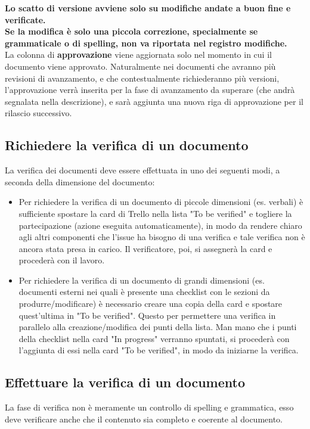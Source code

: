 \noindent
\textbf{Lo scatto di versione avviene solo su modifiche andate a buon fine e verificate.}
\\

\noindent
\textbf{Se la modifica è solo una piccola correzione, specialmente se grammaticale o di
spelling, non va riportata nel registro modifiche.}\\


\noindent
La colonna di \textbf{approvazione} viene aggiornata solo nel momento in cui il documento viene approvato. Naturalmente nei documenti che avranno più revisioni di avanzamento, e che contestualmente richiederanno più versioni, l'approvazione verrà inserita per la fase di avanzamento da superare (che andrà segnalata nella descrizione), e sarà aggiunta una nuova riga di approvazione per il rilascio successivo.

\subsection{Richiedere la verifica di un documento}
La verifica dei documenti deve essere effettuata in uno dei seguenti modi, a seconda della dimensione del documento:
\begin{itemize}
    \item Per richiedere la verifica di un documento di piccole dimensioni (es. verbali) è sufficiente spostare la card di Trello nella lista "To be verified" e togliere la partecipazione (azione eseguita automaticamente), in modo da rendere chiaro agli altri componenti che l'issue ha bisogno di una verifica e tale verifica non è ancora stata presa in carico. Il verificatore, poi, si assegnerà la card e procederà con il lavoro.
    \item Per richiedere la verifica di un documento di grandi dimensioni (es. documenti esterni nei quali è presente una checklist con le sezioni da produrre/modificare) è necessario creare una copia della card e spostare quest'ultima in "To be verified". Questo per permettere una verifica in parallelo alla creazione/modifica dei punti della lista. Man mano che i punti della checklist nella card "In progress" verranno spuntati, si procederà con l'aggiunta di essi nella card "To be verified", in modo da iniziarne la verifica.
\end{itemize}

\subsection{Effettuare la verifica di un documento}
La fase di verifica non è meramente un controllo di spelling e grammatica, esso
deve verificare anche che il contenuto sia completo e coerente al documento.

